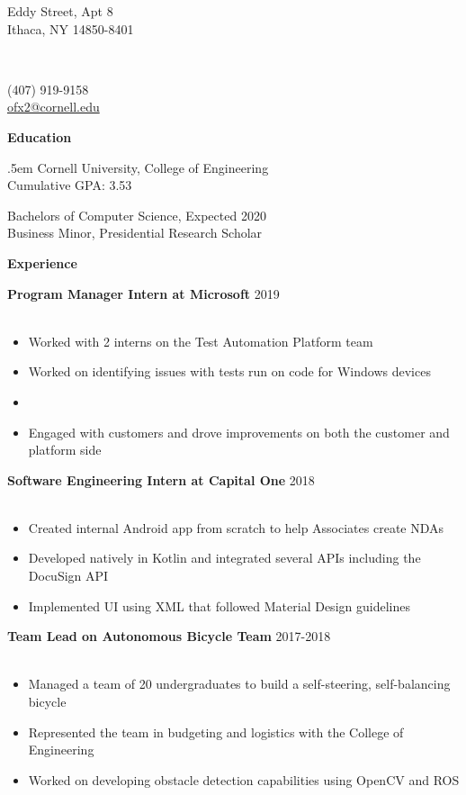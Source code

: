 \documentclass[12pt]{article}
\makeatletter
\newcommand{\name}{OLIVIA XIANG}
\newcommand{\addressPartOne}{311 Eddy Street, Apt 8}
\newcommand{\addressPartTwo}{Ithaca, NY 14850-8401}
\newcommand{\phoneNumber}{(407) 919-9158}
\newcommand{\email}{ofx2@cornell.edu}
\newcommand{\gpa}{3.53}
\newcommand{\header}[5]{
	\begin{minipage}{0.3\linewidth} 
		\fontsize{12}{0} \selectfont
		#2\\[.25em]
		#3\\
		\vspace{1em} 
	\end{minipage}
	\vspace{-.75em}
	\begin{minipage}{0.4\linewidth} 
		\fontsize{16}{0} \selectfont
		\center{\textbf{#1}}\\
		\vspace{2em} 
	\end{minipage}
	\begin{minipage}{0.25\linewidth}
		\begin{flushright}
			\fontsize{12}{0} \selectfont
			#4\\[.25em]
			#5\\
			\vspace{1em} 
		\end{flushright}
	\end{minipage}
	\makebox[\linewidth]{\rule{100em}{.4pt}}
	\vspace{-.4em}
}
\newcommand{\captionSplitLeft}[7]{
	\makeCaption{#1}{#2}
	
	\splitLeft{#3}{#4}{#5}{#6}{#7}
}
\newcommand{\splitLeft}[5]{
	\begin{minipage}{#3\linewidth}
		\begin{adjustwidth}{#1}{}
			\fontsize{11}{12} \selectfont
			#2
		\end{adjustwidth}
	\end{minipage}
	\begin{minipage}{#5\linewidth}
		\begin{flushleft}
			\fontsize{11}{12} \selectfont 
			#4
		\end{flushleft}
	\end{minipage} 
	\vspace{1em}
}
\newcommand{\makeCaption}[2]{
	\fontsize{14}{0} \selectfont
	\textbf{#1}
	\vspace{#2}
}
\newcommand{\group}[1]{
	\fontsize{14}{0} \selectfont
	\textbf{#1}
}
\newcommand{\jobCaption}[2]{
	\hspace{0.3em}
	\fontsize{12}{13} \selectfont
	\textbf{#1}
	\fontsize{11}{12} \selectfont 
	\hfill{#2}\\[.1em]
}
\makeatother
\begin{document}
	\header	{\name}
		{\addressPartOne}
		{\addressPartTwo}
		{\phoneNumber}
		{\href{mailto:\email}{\email}}



	\captionSplitLeft{Education}{.4em}{.5em}
		{Cornell University, College of Engineering\\
			Cumulative GPA: \gpa}{.5}
		{Bachelors of Computer Science, Expected 2020\\
			Business Minor, Presidential Research Scholar}{.5}
	\vspace{-.4em}

	\group{Experience}
	\vspace{.4em}
	
	\jobCaption{Program Manager Intern at Microsoft}{2019}\\[-1.75em]
	\begin{itemize}[leftmargin=1.5cm]
	\setlength\itemsep{-.25em}
	\fontsize{11}{0} \selectfont
	
	\item Worked with 2 interns on the Test Automation Platform team
	\item Worked on identifying issues with tests run on code for Windows devices
	\item 
	\item Engaged with customers and drove improvements on both the customer and platform side
	\end{itemize}
	\vspace{.7em}
	
	
	\jobCaption{Software Engineering Intern at Capital One}{2018}\\[-1.75em]
	\begin{itemize}[leftmargin=1.5cm]
	\setlength\itemsep{-.25em}
	\fontsize{11}{0} \selectfont
	
	\item Created internal Android app from scratch to help Associates create NDAs
	\item Developed natively in Kotlin and integrated several APIs including the DocuSign API
	\item Implemented UI using XML that followed Material Design guidelines
	\end{itemize}
	\vspace{.7em}
	
	\jobCaption{Team Lead on Autonomous Bicycle Team}{2017-2018}\\[-1.75em]
	\begin{itemize}[leftmargin=1.5cm]
	\setlength\itemsep{-.25em}
	\fontsize{11}{0} \selectfont
	\item Managed a team of 20 undergraduates to build a self-steering, self-balancing bicycle
	\item Represented the team in budgeting and logistics with the College of Engineering
	\item Worked on developing obstacle detection capabilities using OpenCV and ROS
	\end{itemize}
	\vspace{.7em}
	
\end{document}
